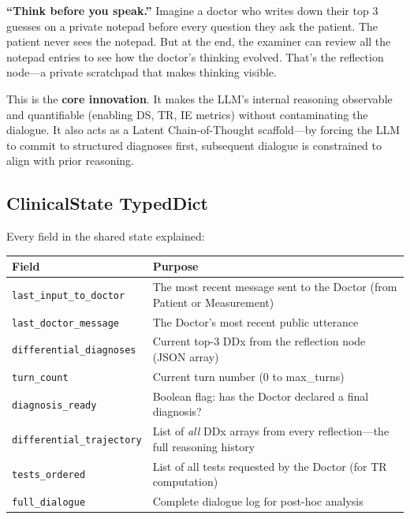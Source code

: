 \begin{analogybox}[\textcolor{white}{Simple Analogy}]
\textbf{``Think before you speak.''} Imagine a doctor who writes down their top 3 guesses on a private notepad before every question they ask the patient. The patient never sees the notepad. But at the end, the examiner can review all the notepad entries to see how the doctor's thinking evolved. That's the reflection node---a private scratchpad that makes thinking visible.
\end{analogybox}

\begin{mattersbox}[\textcolor{white}{Why It Matters for This Thesis}]
This is the \textbf{core innovation}. It makes the LLM's internal reasoning observable and quantifiable (enabling DS, TR, IE metrics) without contaminating the dialogue. It also acts as a Latent Chain-of-Thought scaffold---by forcing the LLM to commit to structured diagnoses first, subsequent dialogue is constrained to align with prior reasoning.
\end{mattersbox}

\subsection{ClinicalState TypedDict}

Every field in the shared state explained:

\begin{center}
\begin{tabular}{@{}p{5cm}p{9cm}@{}}
\toprule
\textbf{Field} & \textbf{Purpose} \\
\midrule
\texttt{last\_input\_to\_doctor} & The most recent message sent to the Doctor (from Patient or Measurement) \\
\texttt{last\_doctor\_message} & The Doctor's most recent public utterance \\
\texttt{differential\_diagnoses} & Current top-3 DDx from the reflection node (JSON array) \\
\texttt{turn\_count} & Current turn number (0 to max\_turns) \\
\texttt{diagnosis\_ready} & Boolean flag: has the Doctor declared a final diagnosis? \\
\texttt{differential\_trajectory} & List of \textit{all} DDx arrays from every reflection---the full reasoning history \\
\texttt{tests\_ordered} & List of all tests requested by the Doctor (for TR computation) \\
\texttt{full\_dialogue} & Complete dialogue log for post-hoc analysis \\
\bottomrule
\end{tabular}
\end{center}

